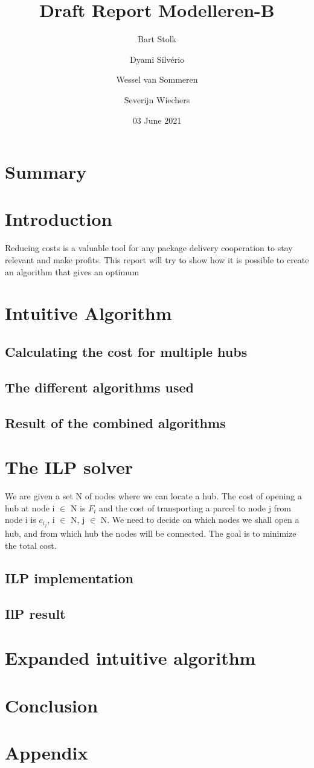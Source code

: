 \documentclass{article}
\title{Draft Report Modelleren-B}
\author{Bart Stolk \and Dyami Silvério \and Wessel van Sommeren \and Severijn Wiechers}
\date{03 June 2021}
\begin{document}
\maketitle

\newpage
\section*{Summary}



\newpage
\tableofcontents



\newpage
\section{Introduction}
Reducing costs is a valuable tool for any package delivery cooperation to stay relevant and make profits. This report will try to show how it is possible to create an algorithm that gives an optimum 
\newpage
\section{Intuitive Algorithm}

    \subsection{Calculating the cost for multiple hubs}
    \subsection{The different algorithms used}
    \subsection{Result of the combined algorithms}
 
 
\newpage  
\section{The ILP solver}
We are given a set N of nodes where we can locate a hub. The cost of opening a hub at node i $\in$ N is $F_i$ and the cost of transporting a parcel to node j from node i is $c_{i_j}$, i $\in$ N, j $\in$ N. We need to decide on which nodes we shall open a hub, and from which hub the nodes will be connected. The goal is to minimize the total cost. 
    \subsection{ILP implementation}
    \subsection{IlP result}

\newpage
\section{Expanded intuitive algorithm}

\newpage
\section{Conclusion}


\section{Appendix} 
\end{document}
